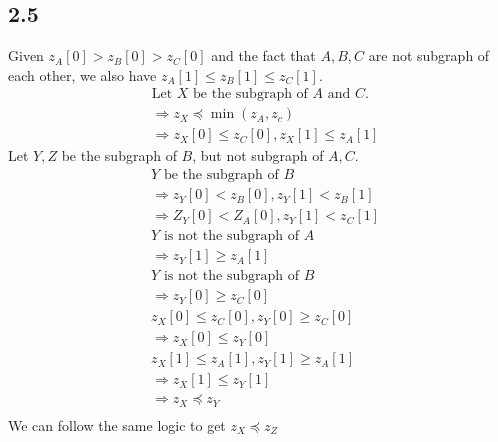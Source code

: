 \documentclass{article}
\begin{document}
\subsection*{2.5}
Given $z_A[0] > z_B[0] > z_C[0]$ and the fact that $A, B, C$ are not subgraph of each other, we also have $z_A[1] \leq z_B[1] \leq z_C[1]$. 
    \begin{align*}
        & \textrm{Let $X$ be the subgraph of $A$ and $C$.}\\
        & \Longrightarrow z_X \preccurlyeq \min(z_A, z_c)\\
        & \Longrightarrow z_X[0] \leq z_C[0], z_X[1] \leq z_A[1]
    \end{align*}
Let $Y, Z$ be the subgraph of $B$, but not subgraph of $A, C$. 
    \begin{align*}
        & \textrm{$Y$ be the subgraph of $B$} \\
        & \Longrightarrow z_Y[0] < z_B[0], z_Y[1] < z_B[1]\\
        & \Longrightarrow Z_Y[0] < Z_A[0], z_Y[1] < z_C[1] \\
        & \textrm{$Y$ is not the subgraph of $A$}\\
        & \Longrightarrow z_Y[1] \geq z_A[1] \\
        & \textrm{$Y$ is not the subgraph of $B$} \\
        & \Longrightarrow z_Y[0] \geq z_C[0]\\
        & z_X[0] \leq z_C[0], z_Y[0] \geq z_C[0]\\
        & \Longrightarrow z_X[0] \leq z_Y[0]\\
        & z_X[1] \leq z_A[1], z_Y[1] \geq z_A[1]\\
        & \Longrightarrow z_X[1] \leq z_Y[1]\\
        & \Longrightarrow z_X \preccurlyeq z_Y\\
    \end{align*}
We can follow the same logic to get $z_X \preccurlyeq z_Z $
\end{document}
